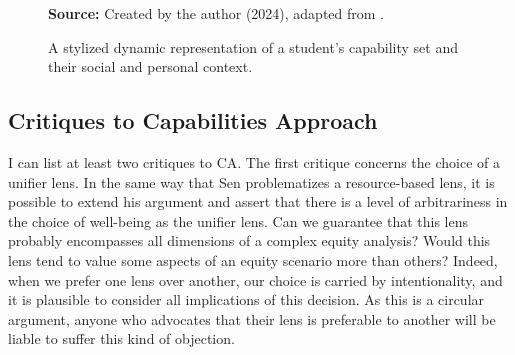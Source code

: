 \begin{figure}[ht!]
\centering

\caption{\textmd{A stylized dynamic representation of a student's capability set and their social and personal context.}}
\label{fig:grouped-robeyns-representation}

\par\medskip\ABNTEXfontereduzida\selectfont\textbf{Source:} Created by the author (2024), adapted from .
\end{figure}

\subsection{Critiques to Capabilities Approach}
\label{sen-ss:critiques}

I can list at least two critiques to \gls{CA}. The first critique concerns the choice of a unifier lens. In the same way that Sen problematizes a resource-based lens, it is possible to extend his argument and assert that there is a level of arbitrariness in the choice of well-being as the unifier lens. Can we guarantee that this lens probably encompasses all dimensions of a complex equity analysis? Would this lens tend to value some aspects of an equity scenario more than others? Indeed, when we prefer one lens over another, our choice is carried by intentionality, and it is plausible to consider all implications of this decision. As this is a circular argument, anyone who advocates that their lens is preferable to another will be liable to suffer this kind of objection.

